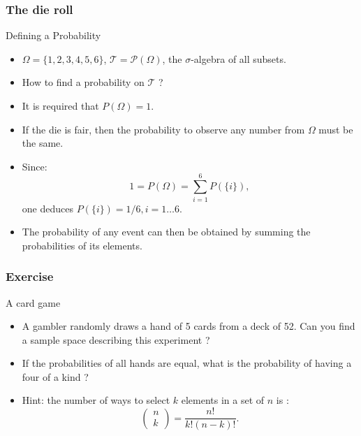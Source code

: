 \documentclass[main.tex]{subfiles}
\begin{document}
\begin{frame}
    \frametitle{The die roll}
\begin{block}{Defining a Probability}
    \begin{itemize}
        \item<+-> $\Omega = \{1,2,3,4,5,6\}$, $\mathcal{T} = \mathcal{P}\left( \Omega \right)$, 
        the $\sigma$-algebra of all subsets. 
        \item<+-> How to find a probability on $\mathcal{T}$ ?
        \item<+-> It is required that $P\left( \Omega \right) = 1.$
        \item<+-> If the die is fair, then the probability to observe any number
        from $\Omega$ must be the same.
        \item<+-> Since:
        \begin{equation}
            1 = P\left( \Omega \right) = \sum_{i=1}^6 P\left( \{i\} \right),
        \end{equation}
        one deduces $P\left( \{i\} \right) = 1/6, i=1 \dots 6.$
        \item<+-> The probability of any event can then be obtained by summing the probabilities
        of its elements. 
    \end{itemize}
\end{block}
\end{frame}
\begin{frame}
    \frametitle{Exercise}
\begin{block}{A card game}
   \begin{itemize}
    \item<+-> A gambler randomly draws a hand of 5 cards from a deck of 52. Can you find 
    a sample space describing this experiment ?
    \item<+-> If the probabilities of all hands are equal, what is the probability of having a four of a kind ?
    \item<+-> Hint: the number of ways to select $k$ elements in a set of $n$
    is :
    \begin{equation}
        \begin{pmatrix}
            n \\ k
        \end{pmatrix} = \frac{n!}{k!\left( n-k \right)!}.
    \end{equation}
   \end{itemize} 
\end{block}
\end{frame}
\end{document}
